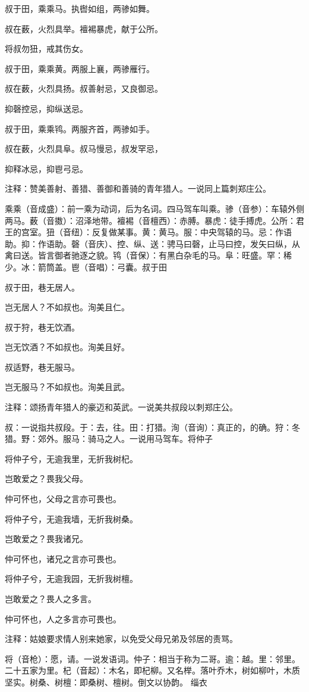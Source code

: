 \documentclass[12pt,UTF8]{ctexbook}
\begin{document}
叔于田，乘乘马。执辔如组，两骖如舞。

叔在薮，火烈具举。襢裼暴虎，献于公所。

将叔勿狃，戒其伤女。

叔于田，乘乘黄。两服上襄，两骖雁行。

叔在薮，火烈具扬。叔善射忌，又良御忌。

抑磬控忌，抑纵送忌。

叔于田，乘乘鸨。两服齐首，两骖如手。

叔在薮，火烈具阜。叔马慢忌，叔发罕忌，

抑释冰忌，抑鬯弓忌。

注释：赞美善射、善猎、善御和善骑的青年猎人。一说同上篇刺郑庄公。

乘乘（音成盛）：前一乘为动词，后为名词。四马驾车叫乘。骖（音参）：车辕外侧两马。薮（音擞）：沼泽地带。襢裼（音檀西）：赤膊。暴虎：徒手搏虎。公所：君王的宫室。狃（音纽）：反复做某事。黄：黄马。服：中央驾辕的马。忌：作语助。抑：作语助。磬（音庆）、控、纵、送：骋马曰磬，止马曰控，发矢曰纵，从禽曰送。皆言御者驰逐之貌。鸨（音保）：有黑白杂毛的马。阜：旺盛。罕：稀少。冰：箭筒盖。鬯（音唱）：弓囊。叔于田

叔于田，巷无居人。

岂无居人？不如叔也。洵美且仁。

叔于狩，巷无饮酒。

岂无饮酒？不如叔也。洵美且好。

叔适野，巷无服马。

岂无服马？不如叔也。洵美且武。

注释：颂扬青年猎人的豪迈和英武。一说美共叔段以刺郑庄公。

叔：一说指共叔段。于：去，往。田：打猎。洵（音询）：真正的，的确。狩：冬猎。野：郊外。服马：骑马之人。一说用马驾车。将仲子

将仲子兮，无逾我里，无折我树杞。

岂敢爱之？畏我父母。

仲可怀也，父母之言亦可畏也。

将仲子兮，无逾我墙，无折我树桑。

岂敢爱之？畏我诸兄。

仲可怀也，诸兄之言亦可畏也。

将仲子兮，无逾我园，无折我树檀。

岂敢爱之？畏人之多言。

仲可怀也，人之多言亦可畏也。

注释：姑娘要求情人别来她家，以免受父母兄弟及邻居的责骂。

将（音枪）：愿，请。一说发语词。仲子：相当于称为二哥。逾：越。里：邻里。二十五家为里。杞（音起）：木名，即杞柳。又名榉。落叶乔木，树如柳叶，木质坚实。树桑、树檀：即桑树、檀树。倒文以协韵。 缁衣
\end{document}

